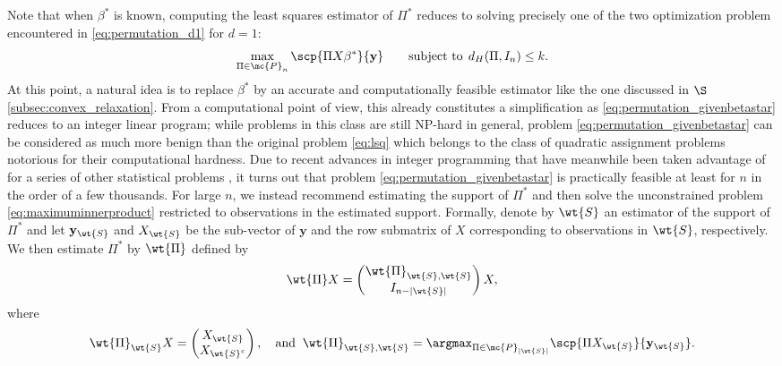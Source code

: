 \documentclass[11pt]{article}
\def\y{\mathbf{y}}
\begin{document}
Note that when $\beta^*$ is known, computing the least squares estimator of $\Pi^*$ reduces to solving precisely one of the two optimization problem encountered in \eqref{eq:permutation_d1} for $d = 1$:
\begin{equation}\label{eq:permutation_givenbetastar}
\max_{\Pi \in \mc{P}_{n}} \scp{\Pi X \beta^*}{\y}  \qquad \text{subject to} \;\, d_H(\Pi, I_n) \leq k. 
\end{equation}
At this point, a natural idea is to replace $\beta^*$ by an accurate and computationally feasible estimator like the one
discussed in $\S$\ref{subsec:convex_relaxation}. From a computational point of view, this already constitutes a simplification
as \eqref{eq:permutation_givenbetastar} reduces to an integer linear program; while problems in this class are still NP-hard in general, problem \eqref{eq:permutation_givenbetastar} can be considered as much more benign than the original problem \eqref{eq:lsq} which belongs to the class of quadratic assignment problems notorious for their computational hardness. Due to recent advances in integer programming that have meanwhile been taken advantage of for a series of other statistical problems \cite{Bertsimas2013, Bertsimas2016}, it turns out that problem \eqref{eq:permutation_givenbetastar} is practically feasible at least for $n$ in the order of a few thousands. For large $n$, we instead recommend estimating the support of $\Pi^*$ and then solve the unconstrained problem \eqref{eq:maximuminnerproduct} restricted to observations in the estimated support. Formally, denote by $\wt{S}$ an estimator of the support of $\Pi^*$ and let 
$\y_{\wt{S}}$ and $X_{\wt{S}}$ be the sub-vector of $\y$ and the row submatrix of $X$ corresponding to observations in $\wt{S}$, respectively.  We then estimate $\Pi^*$ by $\wt{\Pi}$ defined by
\begin{equation}\label{eq:permutation_estimated_support}
  \wt{\Pi} X =    \begin{pmatrix}
    \wt{\Pi}_{\wt{S},\wt{S}} \\
    I_{n - |\wt{S}|}
  \end{pmatrix} X,
\end{equation}
where 
\begin{equation*}
\wt{\Pi}_{\wt{S}} X = \begin{pmatrix}
  X_{\wt{S}} \\
  X_{\wt{S}^c}
\end{pmatrix}, \quad \text{and} \; \; \wt{\Pi}_{\wt{S}, \wt{S}} = \argmax_{\Pi \in \mc{P}_{|\wt{S}|}} \scp{\Pi X_{\wt{S}}}{\y_{\wt{S}}}.  
\end{equation*}
\end{document}
